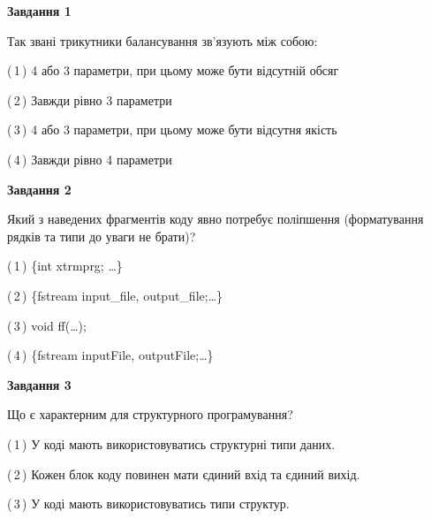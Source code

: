 \documentclass[10pt, ukrainian]{article}
\begin{document}
{
\begin {large}
{\begin {center}\textbf{Завдання 1}\end {center}}\par
Так звані трикутники балансування зв'язують між собою:\par
\vspace{2mm}



(\,1\,) 4 або 3 параметри, при цьому може бути відсутній обсяг %



(\,2\,) Завжди рівно 3 параметри%



(\,3\,) 4 або 3 параметри, при цьому може бути відсутня якість%



(\,4\,) Завжди рівно 4 параметри%


{\begin {center}\textbf{Завдання 2}\end {center}}\par
Який з наведених фрагментів коду явно потребує поліпшення (форматування рядків та типи до уваги не брати)?\par
\vspace{2mm}



(\,1\,) \{int xtrmprg; …\}%



(\,2\,) \{fstream input\_file, output\_file;…\} %



(\,3\,) void ff(…);%



(\,4\,) \{fstream inputFile, outputFile;…\} %


{\begin {center}\textbf{Завдання 3}\end {center}}\par
Що є характерним для структурного програмування?\par
\vspace{2mm}



(\,1\,) У коді мають використовуватись структурні типи даних. %



(\,2\,) Кожен блок коду повинен мати єдиний вхід та єдиний вихід.%



(\,3\,) У коді мають використовуватись типи структур. %




\end{large}}
\end{document}
